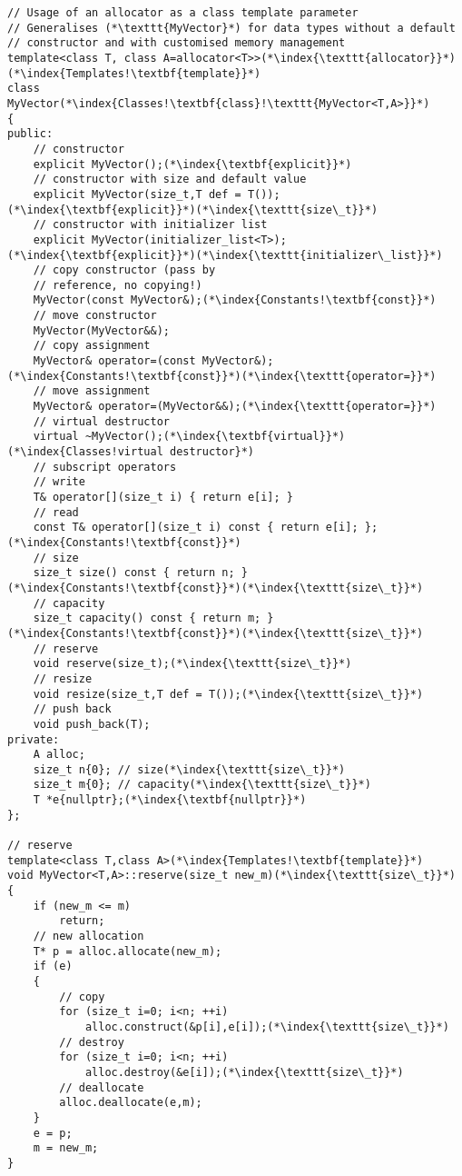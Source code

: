 \documentclass[10pt]{book}
\begin{document}
\begin{lstlisting}
// Usage of an allocator as a class template parameter
// Generalises (*\texttt{MyVector}*) for data types without a default
// constructor and with customised memory management
template<class T, class A=allocator<T>>(*\index{\texttt{allocator}}*)(*\index{Templates!\textbf{template}}*)
class MyVector(*\index{Classes!\textbf{class}!\texttt{MyVector<T,A>}}*)
{
public:
    // constructor
    explicit MyVector();(*\index{\textbf{explicit}}*)
    // constructor with size and default value
    explicit MyVector(size_t,T def = T());(*\index{\textbf{explicit}}*)(*\index{\texttt{size\_t}}*)
    // constructor with initializer list
    explicit MyVector(initializer_list<T>);(*\index{\textbf{explicit}}*)(*\index{\texttt{initializer\_list}}*)
    // copy constructor (pass by
    // reference, no copying!)
    MyVector(const MyVector&);(*\index{Constants!\textbf{const}}*)
    // move constructor
    MyVector(MyVector&&);
    // copy assignment
    MyVector& operator=(const MyVector&);(*\index{Constants!\textbf{const}}*)(*\index{\texttt{operator=}}*)
    // move assignment
    MyVector& operator=(MyVector&&);(*\index{\texttt{operator=}}*)
    // virtual destructor
    virtual ~MyVector();(*\index{\textbf{virtual}}*)(*\index{Classes!virtual destructor}*)
    // subscript operators
    // write
    T& operator[](size_t i) { return e[i]; }
    // read
    const T& operator[](size_t i) const { return e[i]; };(*\index{Constants!\textbf{const}}*)
    // size
    size_t size() const { return n; }(*\index{Constants!\textbf{const}}*)(*\index{\texttt{size\_t}}*)
    // capacity
    size_t capacity() const { return m; }(*\index{Constants!\textbf{const}}*)(*\index{\texttt{size\_t}}*)
    // reserve
    void reserve(size_t);(*\index{\texttt{size\_t}}*)
    // resize
    void resize(size_t,T def = T());(*\index{\texttt{size\_t}}*)
    // push back
    void push_back(T);
private:
    A alloc;
    size_t n{0}; // size(*\index{\texttt{size\_t}}*)
    size_t m{0}; // capacity(*\index{\texttt{size\_t}}*)
    T *e{nullptr};(*\index{\textbf{nullptr}}*)
};

// reserve
template<class T,class A>(*\index{Templates!\textbf{template}}*)
void MyVector<T,A>::reserve(size_t new_m)(*\index{\texttt{size\_t}}*)
{
    if (new_m <= m)
        return;
    // new allocation
    T* p = alloc.allocate(new_m);
    if (e)
    {
        // copy
        for (size_t i=0; i<n; ++i)
            alloc.construct(&p[i],e[i]);(*\index{\texttt{size\_t}}*)
        // destroy
        for (size_t i=0; i<n; ++i)
            alloc.destroy(&e[i]);(*\index{\texttt{size\_t}}*)
        // deallocate
        alloc.deallocate(e,m);
    }
    e = p;
    m = new_m;
}
\end{lstlisting}
\end{document}
